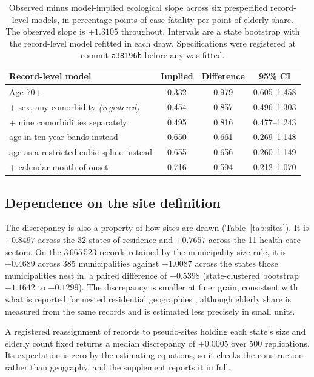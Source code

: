 \documentclass[11pt]{article}
\begin{document}
\begin{table}[t]
\centering
\caption{Observed minus model-implied ecological slope across six
prespecified record-level models, in percentage points of case fatality
per point of elderly share.  The observed slope is $+1.3105$ throughout.
Intervals are a state bootstrap with the record-level model refitted in
each draw.  Specifications were registered at commit \texttt{a38196b}
before any was fitted.}
\label{tab:ladder}
\begin{tabular}{lccc}
\toprule
Record-level model & Implied & Difference & 95\% CI \\
\midrule
Age 70+                                   & 0.332 & 0.979 & 0.605--1.458 \\
\;\;+ sex, any comorbidity \emph{(registered)} & 0.454 & 0.857 & 0.496--1.303 \\
\;\;+ nine comorbidities separately       & 0.495 & 0.816 & 0.477--1.243 \\
\;\;age in ten-year bands instead           & 0.650 & 0.661 & 0.269--1.148 \\
\;\;age as a restricted cubic spline instead & 0.655 & 0.656 & 0.260--1.149 \\
\;\;+ calendar month of onset             & 0.716 & 0.594 & 0.212--1.070 \\
\bottomrule
\end{tabular}
\end{table}

\subsection{Dependence on the site definition}

The discrepancy is also a property of how sites are drawn
(Table~\ref{tab:sites}).  It is $+0.8497$ across the 32 states of
residence and $+0.7657$ across the 11 health-care sectors.  On the
3\,665\,523 records retained by the municipality size rule, it is
$+0.4689$ across 385 municipalities against $+1.0087$ across the states
those municipalities nest in, a paired difference of $-0.5398$
(state-clustered bootstrap $-1.1642$ to $-0.1299$).  The discrepancy is smaller at finer grain, consistent with what is reported for nested residential
geographies \cite{best2001ecological,lancaster2006reducing}, although
elderly share is measured from the same records and is estimated less
precisely in small units.

A registered reassignment of records to pseudo-sites holding each
state's size and elderly count fixed returns a median discrepancy of
$+0.0005$ over 500 replications.  Its expectation is zero by the
estimating equations, so it checks the construction rather than
geography, and the supplement reports it in full.
\end{document}
